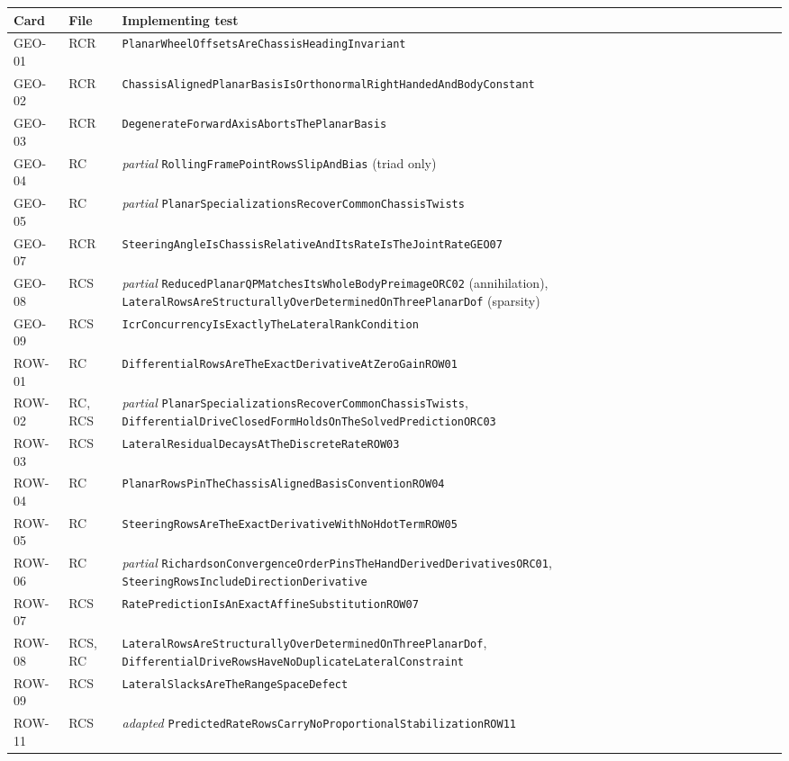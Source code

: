 \documentclass[10pt]{article}
\begin{document}
{\small
\begin{longtable}{|l|l|p{}|}
  \hline
  Card & File & Implementing test \\
  \hline
  \endhead
  GEO-01 & RCR & \texttt{PlanarWheelOffsetsAreChassisHeadingInvariant} \\
  GEO-02 & RCR & \texttt{ChassisAlignedPlanarBasisIsOrthonormalRightHandedAndBodyConstant} \\
  GEO-03 & RCR & \texttt{DegenerateForwardAxisAbortsThePlanarBasis} \\
  GEO-04 & RC & \emph{partial} \texttt{RollingFramePointRowsSlipAndBias} (triad only) \\
  GEO-05 & RC & \emph{partial} \texttt{PlanarSpecializationsRecoverCommonChassisTwists} \\
  GEO-07 & RCR & \texttt{SteeringAngleIsChassisRelativeAndItsRateIsTheJointRateGEO07} \\
  GEO-08 & RCS & \emph{partial} \texttt{ReducedPlanarQPMatchesItsWholeBodyPreimageORC02} (annihilation),
    \texttt{LateralRowsAreStructurallyOverDeterminedOnThreePlanarDof} (sparsity) \\
  GEO-09 & RCS & \texttt{IcrConcurrencyIsExactlyTheLateralRankCondition} \\
  ROW-01 & RC & \texttt{DifferentialRowsAreTheExactDerivativeAtZeroGainROW01} \\
  ROW-02 & RC, RCS & \emph{partial} \texttt{PlanarSpecializationsRecoverCommonChassisTwists},
    \texttt{DifferentialDriveClosedFormHoldsOnTheSolvedPredictionORC03} \\
  ROW-03 & RCS & \texttt{LateralResidualDecaysAtTheDiscreteRateROW03} \\
  ROW-04 & RC & \texttt{PlanarRowsPinTheChassisAlignedBasisConventionROW04} \\
  ROW-05 & RC & \texttt{SteeringRowsAreTheExactDerivativeWithNoHdotTermROW05} \\
  ROW-06 & RC & \emph{partial} \texttt{RichardsonConvergenceOrderPinsTheHandDerivedDerivativesORC01},
    \texttt{SteeringRowsIncludeDirectionDerivative} \\
  ROW-07 & RCS & \texttt{RatePredictionIsAnExactAffineSubstitutionROW07} \\
  ROW-08 & RCS, RC & \texttt{LateralRowsAreStructurallyOverDeterminedOnThreePlanarDof},
    \texttt{DifferentialDriveRowsHaveNoDuplicateLateralConstraint} \\
  ROW-09 & RCS & \texttt{LateralSlacksAreTheRangeSpaceDefect} \\
  ROW-11 & RCS & \emph{adapted} \texttt{PredictedRateRowsCarryNoProportionalStabilizationROW11} \\

\end{longtable}}
\end{document}
